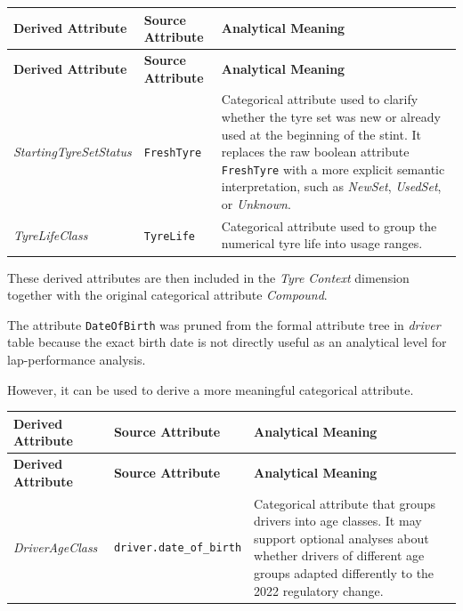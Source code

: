 \documentclass[a4paper,11pt]{article}
\begin{document}
	\begin{longtable}{|p{4.2cm}|p{4.2cm}|p{6.2cm}|}
		\hline
		\textbf{Derived Attribute} & \textbf{Source Attribute} & \textbf{Analytical Meaning} \\
		\hline
		\endfirsthead
		
		\hline
		\textbf{Derived Attribute} & \textbf{Source Attribute} & \textbf{Analytical Meaning} \\
		\hline
		\endhead
		
		\textit{StartingTyreSetStatus}
		& \texttt{FreshTyre}
		& Categorical attribute used to clarify whether the tyre set was new or already used at the beginning of the stint. It replaces the raw boolean attribute \texttt{FreshTyre} with a more explicit semantic interpretation, such as \textit{NewSet}, \textit{UsedSet}, or \textit{Unknown}. \\
		\hline
		
		\textit{TyreLifeClass}
		& \texttt{TyreLife}
		& Categorical attribute used to group the numerical tyre life into usage ranges. \\
		\hline
		
	\end{longtable}
		

	These derived attributes are then included in the \textit{Tyre Context} dimension together
	with the original categorical attribute \textit{Compound}.
	
	The attribute \texttt{DateOfBirth} was pruned from the formal attribute tree in \textit{driver} table because the
	exact birth date is not directly useful as an analytical level for lap-performance analysis.
	
	However, it can be used to derive a more meaningful categorical attribute.
	
	\begin{longtable}{|p{4.2cm}|p{4.2cm}|p{6.2cm}|}
		\hline
		\textbf{Derived Attribute} & \textbf{Source Attribute} & \textbf{Analytical Meaning} \\
		\hline
		\endfirsthead
		
		\hline
		\textbf{Derived Attribute} & \textbf{Source Attribute} & \textbf{Analytical Meaning} \\
		\hline
		\endhead
		
		\textit{DriverAgeClass}
		& \texttt{driver.date\_of\_birth}
		& Categorical attribute that groups drivers into age classes. It may support optional analyses about whether drivers of different age groups adapted differently to the 2022 regulatory change. \\
		\hline
	\end{longtable}
	
\end{document}
